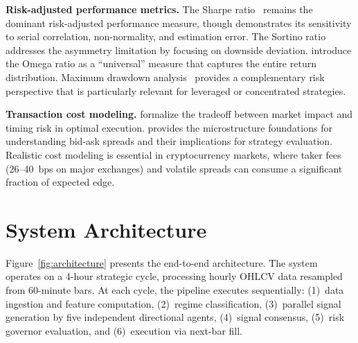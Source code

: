 \documentclass{article}
\begin{document}
\textbf{Risk-adjusted performance metrics.}
The Sharpe ratio~\citep{Sharpe1994SR} remains the dominant risk-adjusted performance measure, though \citet{lo2002statistics} demonstrates its sensitivity to serial correlation, non-normality, and estimation error.
The Sortino ratio~\citep{sortino1991downside} addresses the asymmetry limitation by focusing on downside deviation.
\citet{keating2002universal} introduce the Omega ratio as a ``universal'' measure that captures the entire return distribution.
Maximum drawdown analysis~\citep{magdonismail2004brownian} provides a complementary risk perspective that is particularly relevant for leveraged or concentrated strategies.

\textbf{Transaction cost modeling.}
\citet{almgren2001optimal} formalize the tradeoff between market impact and timing risk in optimal execution.
\citet{hasbrouck2007empirical} provides the microstructure foundations for understanding bid-ask spreads and their implications for strategy evaluation.
Realistic cost modeling is essential in cryptocurrency markets, where taker fees (26--40~bps on major exchanges) and volatile spreads can consume a significant fraction of expected edge.

\section{System Architecture}
\label{sec:architecture}

Figure~\ref{fig:architecture} presents the end-to-end architecture.
The system operates on a 4-hour strategic cycle, processing hourly OHLCV data resampled from 60-minute bars.
At each cycle, the pipeline executes sequentially: (1)~data ingestion and feature computation, (2)~regime classification, (3)~parallel signal generation by five independent directional agents, (4)~signal consensus, (5)~risk governor evaluation, and (6)~execution via next-bar fill.
\end{document}
